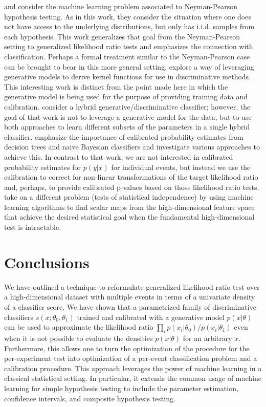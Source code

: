 \documentclass{article} %
\begin{document}
\cite{ClaytonScott} and \cite{JMLR:v14:tong13a} consider the machine learning problem associated to Neyman-Pearson hypothesis testing. As in this work, they consider the situation where one does not have access to the underlying distributions, but only has i.i.d. samples from each hypothesis. This work generalizes that goal from the Neyman-Pearson setting to generalized likelihood ratio tests and emphasizes the connection with classification. Perhaps a  formal treatment similar to the Neyman-Pearson case can be brought to bear in this more general setting.
\cite{TommiJaakkola} explore a way of leveraging generative models to derive kernel functions for use in discriminative methods. This interesting work is distinct from the point made here in which the generative model is being used for the purpose of providing training data and calibration.  \cite{McCallum}
 consider a hybrid generative/discriminative classifier; however, the goal of that work is not to leverage a generative model for the data, but to use both approaches to learn different subsets of the parameters in a single hybrid classifier.  \cite{BiancaZadrozny} emphasize the importance of calibrated probability estimates from decision trees and naive Bayesian classifiers and investigate various approaches to achieve this. In contrast to that work, we are not interested in calibrated probability estimates for $p(y|x)$ for individual events, but instead we use the calibration to correct for non-linear transformations of the target likelihood ratio and, perhaps, to provide calibrated p-values based on those likelihood ratio tests. \cite{Ihler2004} take on a different problem (tests of statistical independence) by using machine learning algorithms to find  scalar maps from the high-dimensional feature space that achieve the desired statistical goal when the fundamental high-dimensional test is intractable.


\section{Conclusions}

We have outlined a technique to reformulate generalized likelihood ratio test over a high-dimensional dataset with multiple events in terms of a univariate density of a classifier score. 
We have shown that a parametrized family of discriminative classifiers $s(x; \theta_0, \theta_1)$ trained and calibrated with a generative model $p(x|\theta)$ can be used to approximate the  likelihood ratio  $\prod_i p(x_i|\theta_0)/p(x_i|\theta_1)$ even when it is not possible to evaluate the densities $p(x|\theta)$ for an arbitrary $x$.  Furthermore, this allows one to turn the optimization of the procedure for the per-experiment test into optimization of a per-event classification problem and a calibration procedure. This approach leverages the power of machine learning in a classical statistical setting. In particular, it extends the common usage of machine learning for simple hypothesis testing to include the parameter estimation, confidence intervals, and composite hypothesis testing.
\end{document}
